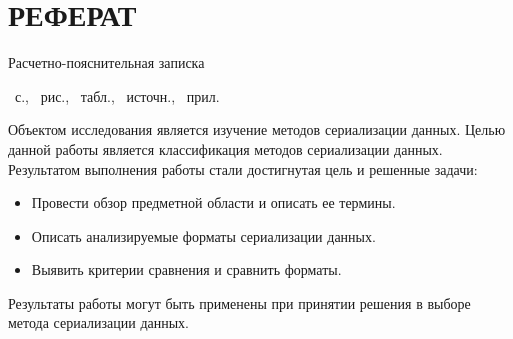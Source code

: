 \chapter*{РЕФЕРАТ}
Расчетно-пояснительная записка \begin{NoHyper}\pageref{LastPage}\end{NoHyper}~с., \totfig~рис., \tottab~табл., \thetotbibentries~источн., ~прил.
	
Объектом исследования является изучение методов сериализации данных.
Целью данной работы является классификация методов сериализации данных.
Результатом выполнения работы стали достигнутая цель и решенные задачи:
\begin{itemize}
\item Провести обзор предметной области и описать ее термины.
\item Описать анализируемые форматы сериализации данных.
\item Выявить критерии сравнения и сравнить форматы.
\end{itemize}

Результаты работы могут быть применены при принятии решения в выборе метода сериализации данных.
